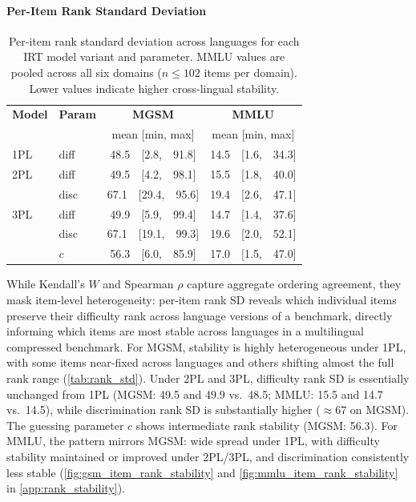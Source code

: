 \documentclass[11pt]{article}
\begin{document}
\paragraph{Per-Item Rank Standard Deviation}

\begin{table}[t]
  \centering
  \small
  \begin{tabular}{llcc}
    \toprule
    \textbf{Model} & \textbf{Param} & \textbf{MGSM} & \textbf{MMLU} \\
                   &                & mean [min, max] & mean [min, max] \\
    \midrule
    1PL & diff & 48.5\ \ [2.8,\ \ 91.8] & 14.5\ \ [1.6,\ \ 34.3] \\
    \midrule
    2PL & diff & 49.5\ \ [4.2,\ \ 98.1] & 15.5\ \ [1.8,\ \ 40.0] \\
        & disc & 67.1\ \ [29.4,\ \ 95.6] & 19.4\ \ [2.6,\ \ 47.1] \\
    \midrule
    3PL & diff & 49.9\ \ [5.9,\ \ 99.4] & 14.7\ \ [1.4,\ \ 37.6] \\
        & disc & 67.1\ \ [19.1,\ \ 99.3] & 19.6\ \ [2.0,\ \ 52.1] \\
        & $c$  & 56.3\ \ [6.0,\ \ 85.9] & 17.0\ \ [1.5,\ \ 47.0] \\
    \bottomrule
  \end{tabular}
  \caption{Per-item rank standard deviation across languages for each IRT
    model variant and parameter. MMLU values are pooled across all six domains
    ($n \leq 102$ items per domain). Lower values indicate higher cross-lingual stability.}
  \label{tab:rank_std}
\end{table}

While Kendall's $W$ and Spearman $\rho$ capture aggregate ordering agreement, they mask item-level heterogeneity: per-item rank SD reveals which individual items preserve their difficulty rank across language versions of a benchmark, directly informing which items are most stable across languages in a multilingual compressed benchmark. For MGSM, stability is highly heterogeneous under 1PL, with some items near-fixed across languages and others shifting almost the full rank range (\autoref{tab:rank_std}). Under 2PL and 3PL, difficulty rank SD is essentially unchanged from 1PL (MGSM: 49.5 and 49.9 vs.\ 48.5; MMLU: 15.5 and 14.7 vs.\ 14.5), while discrimination rank SD is substantially higher ($\approx$67 on MGSM). The guessing parameter $c$ shows intermediate rank stability (MGSM: 56.3). For MMLU, the pattern mirrors MGSM: wide spread under 1PL, with difficulty stability maintained or improved under 2PL/3PL, and discrimination consistently less stable (\autoref{fig:gsm_item_rank_stability} and \autoref{fig:mmlu_item_rank_stability} in \autoref{app:rank_stability}).
\end{document}
